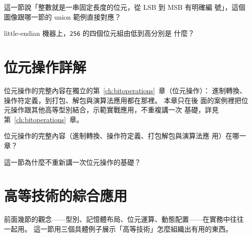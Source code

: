\begin{center}
\label{fig:ch21-little-endian-bytes}
\end{center}

\begin{drills}[label=drills:ext-int-bytes]
\item 這一節說「整數就是一串固定長度的位元，從 LSB 到 MSB 有明確編
號」，這個圖像跟哪一節的 union 範例直接對應？
\item little-endian 機器上，\texttt{256} 的四個位元組由低到高分別是
什麼？
\end{drills}

\section[位元操作（見第 12 章）]{位元操作詳解}
\label{sec:ext-bitops-pointer}

位元操作的完整內容在獨立的第~\ref{ch:bitoperations}~章（位元操作）：
進制轉換、操作符定義，到打包、解包與演算法應用都在那裡。 本章只在後
面的案例裡把位元操作跟其他高等型別結合，示範實戰應用，不重複講一次
基礎，詳見第~\ref{ch:bitoperations}~章。

\begin{drills}[label=drills:ext-bitops-pointer]
\item 位元操作的完整內容（進制轉換、操作符定義、打包解包與演算法應
用）在哪一章？
\item 這一節為什麼不重新講一次位元操作的基礎？
\end{drills}

\section{高等技術的綜合應用}
\label{sec:ext-synthesis}

前面幾節的觀念——型別、記憶體布局、位元運算、動態配置——在實務中往往
一起用。 這一節用三個具體例子展示「高等技術」怎麼組織出有用的東西。

